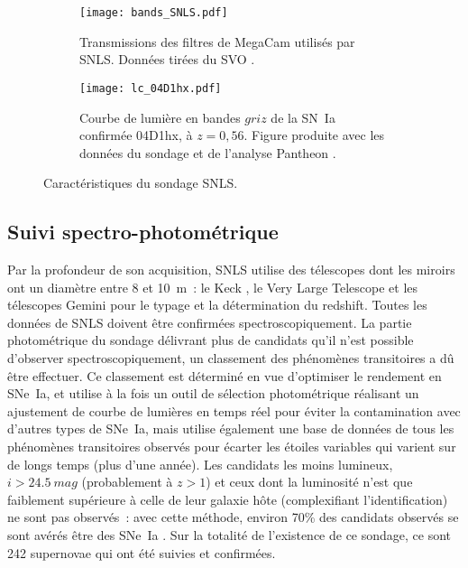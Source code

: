 \documentclass[../main/main.tex]{subfiles}
\begin{document}
\begin{figure}[ht]
    \centering
    \begin{subfigure}[]{.49\linewidth}
        \centering
        \texttt{[image: bands\_SNLS.pdf]}
        \caption{Transmissions des filtres de MegaCam utilisés par SNLS. Données
        tirées du SVO \citep{rodrigo2020}.}
        \label{fig:snlsbands}
    \end{subfigure}
    \begin{subfigure}[]{.49\linewidth}
        \centering
        \texttt{[image: lc\_04D1hx.pdf]}
        \caption{Courbe de lumière en bandes $griz$ de la SN~Ia confirmée
        04D1hx, à $z = 0,56$. Figure produite avec les données du
        sondage et de l'analyse Pantheon \citep{scolnic2018}.}
        \label{fig:snlslc}
    \end{subfigure}
    \caption{Caractéristiques du sondage SNLS.}
\end{figure}

\subsection{Suivi spectro-photométrique}\label{ssec:snlsspectro}

Par la profondeur de son acquisition, SNLS utilise des télescopes dont les
miroirs ont un diamètre entre 8 et \SI{10}{m}~: le Keck \citep{oke1995,
ellis2008}, le Very Large Telescope \citep[VLT,][]{balland2009} et les
télescopes Gemini \citep{hook2004} pour le typage et la détermination du
redshift. Toutes les données de SNLS doivent être confirmées
spectroscopiquement. La partie photométrique du sondage délivrant plus de
candidats qu'il n'est possible d'observer spectroscopiquement, un classement des
phénomènes transitoires a dû être effectuer. Ce classement est déterminé en vue
d'optimiser le rendement en SNe~Ia, et utilise à la fois un outil de sélection
photométrique réalisant un ajustement de courbe de lumières en temps réel pour
éviter la contamination avec d'autres types de SNe~Ia, mais utilise également
une base de données de tous les phénomènes transitoires observés pour écarter
les étoiles variables qui varient sur de longs temps (plus d'une année). Les
candidats les moins lumineux, $i > \SI{24,5}{mag}$ (probablement à $z > 1$) et
ceux dont la luminosité n'est que faiblement supérieure à celle de leur galaxie
hôte (complexifiant l'identification) ne sont pas observés~: avec cette méthode,
environ 70\% des candidats observés se sont avérés être des SNe~Ia
\citep{astier2006}. Sur la totalité de l'existence de ce sondage, ce sont 242
supernovae qui ont été suivies et confirmées.
\end{document}
